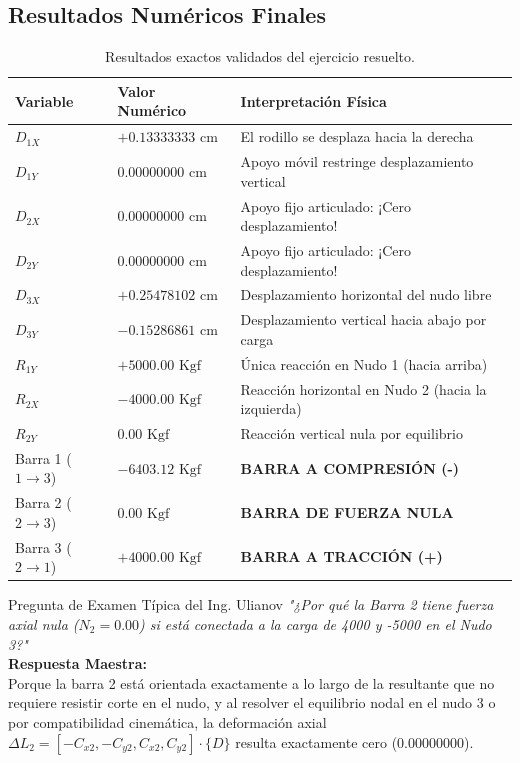 \documentclass[11pt,a4paper]{article}
\begin{document}
\subsection{Resultados Numéricos Finales}
\begin{table}[h]
\centering
\begin{tabular}{lll}
\toprule
\textbf{Variable} & \textbf{Valor Numérico} & \textbf{Interpretación Física} \\
\midrule
$D_{1X}$ & $+0.13333333\text{ cm}$ & El rodillo se desplaza hacia la derecha \\
$D_{1Y}$ & $0.00000000\text{ cm}$ & Apoyo móvil restringe desplazamiento vertical \\
$D_{2X}$ & $0.00000000\text{ cm}$ & Apoyo fijo articulado: ¡Cero desplazamiento! \\
$D_{2Y}$ & $0.00000000\text{ cm}$ & Apoyo fijo articulado: ¡Cero desplazamiento! \\
$D_{3X}$ & $+0.25478102\text{ cm}$ & Desplazamiento horizontal del nudo libre \\
$D_{3Y}$ & $-0.15286861\text{ cm}$ & Desplazamiento vertical hacia abajo por carga \\
\midrule
$R_{1Y}$ & $+5000.00\text{ Kgf}$ & Única reacción en Nudo 1 (hacia arriba) \\
$R_{2X}$ & $-4000.00\text{ Kgf}$ & Reacción horizontal en Nudo 2 (hacia la izquierda) \\
$R_{2Y}$ & $0.00\text{ Kgf}$ & Reacción vertical nula por equilibrio \\
\midrule
Barra 1 ($1 \to 3$) & $-6403.12\text{ Kgf}$ & \textbf{BARRA A COMPRESIÓN (-)} \\
Barra 2 ($2 \to 3$) & $0.00\text{ Kgf}$ & \textbf{BARRA DE FUERZA NULA} \\
Barra 3 ($2 \to 1$) & $+4000.00\text{ Kgf}$ & \textbf{BARRA A TRACCIÓN (+)} \\
\bottomrule
\end{tabular}
\caption{Resultados exactos validados del ejercicio resuelto.}
\end{table}

\begin{examtip}{Pregunta de Examen Típica del Ing. Ulianov}
\textit{"¿Por qué la Barra 2 tiene fuerza axial nula ($N_2 = 0.00$) si está conectada a la carga de 4000 y -5000 en el Nudo 3?"} \\
\textbf{Respuesta Maestra:} \\
Porque la barra 2 está orientada exactamente a lo largo de la resultante que no requiere resistir corte en el nudo, y al resolver el equilibrio nodal en el nudo 3 o por compatibilidad cinemática, la deformación axial $\Delta L_2 = [-C_{x2}, -C_{y2}, C_{x2}, C_{y2}] \cdot \{D\}$ resulta exactamente cero ($0.00000000$).
\end{examtip}
\end{document}
